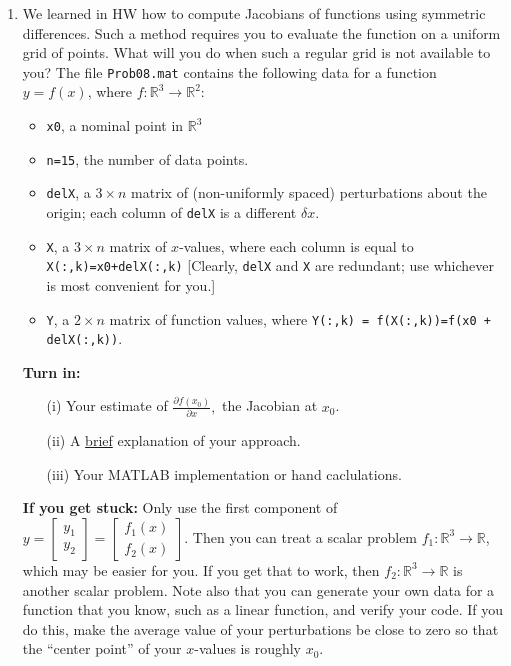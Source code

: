 \documentclass[letterpaper]{article}
\newcommand{\real}{\mathbb R}  %
\begin{document}
    \begin{enumerate}
\setlength{\itemsep}{1cm}
\renewcommand{\labelenumi}{(\alph{enumi})}

\item  We learned in HW how to compute Jacobians of functions using symmetric differences. Such a method requires you to evaluate the function on a uniform grid of points. What will you do when such a regular grid is not available to you? The file \texttt{Prob08.mat} contains the following data for a function $y = f(x)$, where $f:\real^3 \to \real^2$:
    \begin{itemize}

\item   \texttt{x0}, a  nominal point in $ \real^3$

        \item \texttt{n=15}, the number of data points.

\item  \texttt{delX}, a $3 \times n$ matrix of (non-uniformly spaced) perturbations about the origin; each column of \texttt{delX} is a different $\delta x$.

    \item \texttt{X}, a $3 \times n$ matrix of $x$-values, where each column is equal to \texttt{X(:,k)=x0+delX(:,k)}  [Clearly, \texttt{delX} and \texttt{X} are redundant; use whichever is most convenient for you.]

    \item  \texttt{Y}, a $2 \times n$ matrix of function values, where \texttt{Y(:,k) =  f(X(:,k))=f(x0 + delX(:,k))}.

\end{itemize}

\textbf{Turn in:}
\begin{itemize}
\item[(i)] Your estimate of $\frac{\partial f(x_0)}{\partial x}, $ the Jacobian at $x_0$.

\item[(ii)] A \underline{brief} explanation of your approach.

\item[(iii)] Your MATLAB implementation or hand caclulations.

\end{itemize}

\textbf{If you get stuck:} Only use the first component of $y=\begin{bmatrix} y_1 \\ y_2 \end{bmatrix} = \begin{bmatrix} f_1(x) \\ f_2(x) \end{bmatrix}$. Then you can treat a scalar problem $f_1: \real^3 \to \real$, which may be easier for you. If you get that to work, then $f_2: \real^3 \to \real$ is another scalar problem. Note also that you can generate your own data for a function that you know, such as a linear function, and verify your code. If you do this, make the average value of your perturbations be close to zero so that the ``center point'' of your $x$-values is roughly $x_0$.



\end{enumerate}
\end{document}
